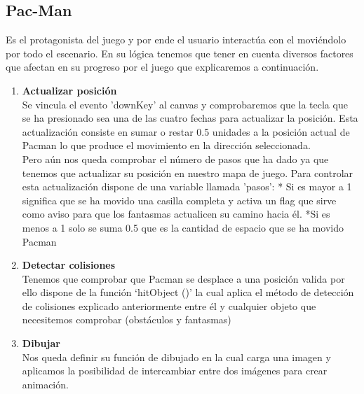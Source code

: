 \subsection{Pac-Man}
Es el protagonista del juego y por ende el usuario interactúa con el moviéndolo por todo el
escenario. En su lógica tenemos que tener en cuenta diversos factores que afectan en su progreso
por el juego que explicaremos a continuación.
\begin{enumerate}
\item \textbf{Actualizar posición} \\ Se vincula el evento 'downKey' al canvas y comprobaremos que la tecla que se ha presionado sea
una de las cuatro fechas para actualizar la posición. Esta actualización consiste en sumar o restar 0.5
unidades a la posición actual de Pacman lo que produce el movimiento en la dirección seleccionada.\\Pero aún nos queda comprobar el número de pasos que ha dado ya que tenemos que actualizar su
posición en nuestro mapa de juego. Para controlar esta actualización dispone de una variable
llamada 'pasos':
 * Si es mayor a 1 significa que se ha movido una casilla completa y activa un flag que sirve
como aviso para que los fantasmas actualicen su camino hacia él.
 *Si es menos a 1 solo se suma 0.5 que es la cantidad de espacio que se ha movido Pacman 
 
\item \textbf{Detectar colisiones} \\ Tenemos que comprobar que Pacman se desplace a una posición valida por ello dispone de la
función ‘hitObject ()’ la cual aplica el método de detección de colisiones explicado anteriormente
entre él y cualquier objeto que necesitemos comprobar (obstáculos y fantasmas)

\item \textbf{ Dibujar} \\ Nos queda definir su función de dibujado en la cual carga una imagen y aplicamos la posibilidad de
intercambiar entre dos imágenes para crear animación.
\end{enumerate}

